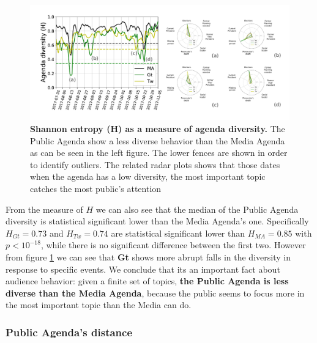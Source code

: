 \begin{figure}[h]
\centering
\includegraphics[width = \textwidth]{images/Fig3.pdf}
\caption{\textbf{Shannon entropy (H) as a measure of agenda diversity.} The Public Agenda show a less diverse behavior than the Media Agenda as can be seen in the left figure. The lower fences are shown in order to identify outliers. The related radar plots shows that those dates when the agenda has a low diversity, the most important topic catches the most public’s attention}
\label{fig:shannon_entropy_agendas}
\end{figure}

\par From the measure of $H$ we can also see that the median of the Public Agenda diversity is statistical significant lower than the Media Agenda's one.
Specifically $H_{Gt} = 0.73$ and $H_{Tw} = 0.74$ are statistical significant lower than $H_{MA} = 0.85$ with $p < 10^{-18}$, while there is no significant difference between the first two. 
However from figure \ref{fig:shannon_entropy_agendas} we can see that \textbf{Gt} shows more abrupt falls in the diversity in response to specific events.
We conclude that its an important fact about audience behavior: given a finite set of topics, \textbf{the Public Agenda is less diverse than the Media Agenda}, because the public seems to focus more in the most important topic than the Media can do.

\subsubsection{Public Agenda's distance}


